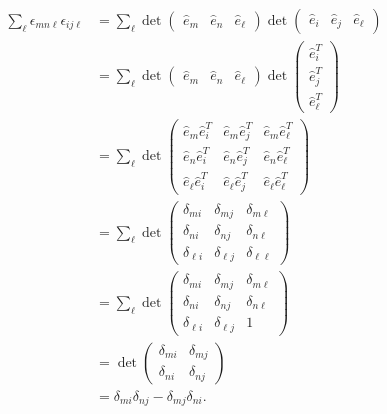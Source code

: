 \documentclass[10pt]{mypackage}
\begin{document}
\begin{align*}
  \sum_{\ell}\epsilon_{mn\ell}\epsilon_{ij\ell} &= \sum_{\ell}\det \begin{pmatrix}\hat{e}_m & \hat{e}_n & \hat{e}_{\ell}\end{pmatrix} \det \begin{pmatrix}\hat{e}_i & \hat{e}_j & \hat{e}_{\ell}\end{pmatrix}\\
                                                &= \sum_{\ell}\det \begin{pmatrix}\hat{e}_m & \hat{e}_n & \hat{e}_{\ell}\end{pmatrix} \det \begin{pmatrix}\hat{e}_i^T\\\hat{e}_j^T\\\hat{e}_{\ell}^T\end{pmatrix}\\
                                                &= \sum_{\ell}\det \begin{pmatrix}\hat{e}_m\hat{e}_i^{T} & \hat{e}_m\hat{e}_j^T & \hat{e}_m\hat{e}_{\ell}^{T}\\ \hat{e}_n\hat{e}_i^{T} & \hat{e}_n\hat{e}_j^T & \hat{e}_n\hat{e}_{\ell}^{T}\\ \hat{e}_{\ell}\hat{e}_i^{T} & \hat{e}_{\ell}\hat{e}_j^T & \hat{e}_{\ell}\hat{e}_{\ell}^{T}\end{pmatrix}\\
                                                &= \sum_{\ell}\det \begin{pmatrix}\delta_{mi} & \delta_{mj} & \delta_{m\ell}\\ \delta_{ni} & \delta_{nj} & \delta_{n\ell} \\ \delta_{\ell i} & \delta_{\ell j} & \delta_{\ell\ell}\end{pmatrix}\\
                                                &= \sum_{\ell}\det \begin{pmatrix}\delta_{mi} & \delta_{mj} & \delta_{m\ell}\\ \delta_{ni} & \delta_{nj} & \delta_{n\ell} \\ \delta_{\ell i} & \delta_{\ell j} & 1\end{pmatrix}\\
                                                &= \det \begin{pmatrix}\delta_{mi} & \delta_{mj} \\ \delta_{ni} & \delta_{nj}\end{pmatrix}\\
                                                &= \delta_{mi}\delta_{nj} - \delta_{mj}\delta_{ni}.
\end{align*}
\end{document}
